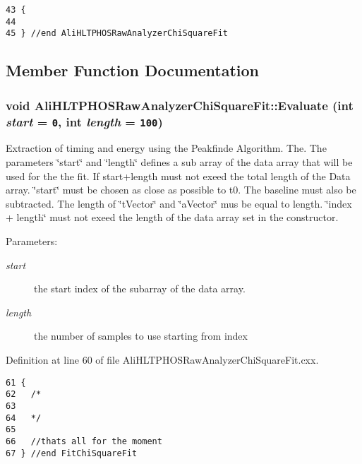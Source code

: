 \footnotesize\begin{verbatim}43 {
44 
45 } //end AliHLTPHOSRawAnalyzerChiSquareFit
\end{verbatim}\normalsize 




\subsection{Member Function Documentation}
\subsubsection{\setlength{\rightskip}{0pt plus 5cm}void Ali\-HLTPHOSRaw\-Analyzer\-Chi\-Square\-Fit::Evaluate (int {\em start} = {\tt 0}, int {\em length} = {\tt 100})\hspace{0.3cm}{\tt  [virtual]}}\label{classAliHLTPHOSRawAnalyzerChiSquareFit_a4}


Extraction of timing and energy using the Peakfinde Algorithm. The. The parameters \char`\"{}start\char`\"{} and \char`\"{}length\char`\"{} defines a sub array of the data array that will be used for the the fit. If start+length must not exeed the total length of the Data array. \char`\"{}start\char`\"{} must be chosen as close as possible to t0. The baseline must also be subtracted. The length of \char`\"{}t\-Vector\char`\"{} and \char`\"{}a\-Vector\char`\"{} mus be equal to length. \char`\"{}index + length\char`\"{} must not exeed the length of the data array set in the constructor. \begin{Desc}
\item[Parameters:]
\begin{description}
\item[{\em start}]the start index of the subarray of the data array. \item[{\em length}]the number of samples to use starting from index \end{description}
\end{Desc}


Definition at line 60 of file Ali\-HLTPHOSRaw\-Analyzer\-Chi\-Square\-Fit.cxx.

\footnotesize\begin{verbatim}61 {
62   /*
63 
64   */
65 
66   //thats all for the moment 
67 } //end FitChiSquareFit
\end{verbatim}\normalsize 


